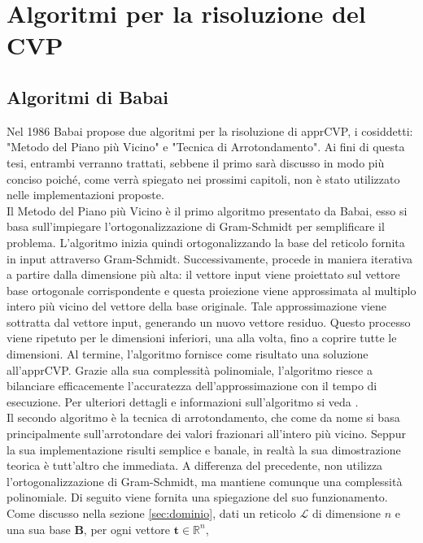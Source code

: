 \section{Algoritmi per la risoluzione del CVP}
\label{CVP}


\subsection{Algoritmi di Babai}
Nel 1986 Babai\cite{Babai86}  propose due algoritmi per la risoluzione di apprCVP, i cosiddetti:
"Metodo del Piano più Vicino" e "Tecnica di Arrotondamento". Ai fini di questa tesi, 
entrambi verranno trattati, sebbene il primo sarà discusso in modo più conciso 
poiché, come verrà spiegato nei prossimi capitoli, non è stato utilizzato nelle 
implementazioni proposte. \\
Il Metodo del Piano più Vicino è il primo algoritmo presentato da Babai, esso si basa sull'impiegare 
l'ortogonalizzazione di Gram-Schmidt per semplificare il problema. L'algoritmo inizia quindi
ortogonalizzando la base del reticolo fornita in 
input attraverso Gram-Schmidt. Successivamente, procede in maniera iterativa a partire 
dalla dimensione più alta: il vettore input viene proiettato sul vettore base ortogonale 
corrispondente e questa proiezione viene approssimata al multiplo intero più vicino del 
vettore della base originale. Tale approssimazione viene sottratta dal vettore input, 
generando un nuovo vettore residuo. Questo processo viene ripetuto per le dimensioni 
inferiori, una alla volta, fino a coprire tutte le dimensioni. Al termine, l'algoritmo 
fornisce come risultato una soluzione all'apprCVP. 
Grazie alla sua complessità polinomiale, l'algoritmo riesce a bilanciare efficacemente 
l'accuratezza dell'approssimazione con il tempo di esecuzione. Per ulteriori dettagli e 
informazioni sull'algoritmo si veda \cite{Galbraith18}. 
\\
Il secondo algoritmo è la tecnica di arrotondamento, che come da nome si basa
principalmente sull'arrotondare dei valori frazionari all'intero più vicino.
Seppur la sua implementazione risulti semplice e banale, in realtà la sua dimostrazione teorica
è tutt'altro che immediata. 
A differenza del precedente, 
non utilizza l'ortogonalizzazione di Gram-Schmidt, ma mantiene comunque una complessità 
polinomiale. Di seguito viene fornita una spiegazione del suo funzionamento. \\
Come discusso nella sezione \ref{sec:dominio}, dati un reticolo $\mathcal{L}$ di dimensione
$n$ e una sua base $\mathbf{B}$, per ogni vettore $\mathbf{t} \in \mathbb{R}^n$,
